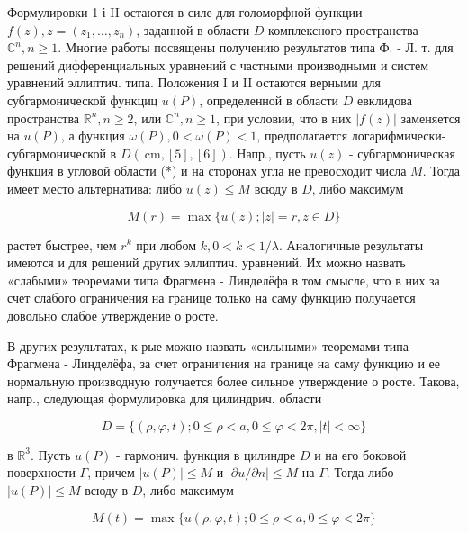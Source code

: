 \documentclass[10pt]{article}
\begin{document}
Формулировки 1 і II остаются в силе для голоморфной функции $f(z), z=\left(z_{1}, \ldots, z_{n}\right)$, заданной в области $D$ комплексного пространства $\mathbb{C}^{n}, n \geqslant 1$. Многие работы посвящены получению результатов типа Ф. - Л. т. для решений дифференциальных уравнений с частными производными и систем уравнений эллиптич. типа. Положения I и II остаются верными для субгармонической функциц $u(P)$, определенной в области $D$ евклидова пространства $\mathbb{R}^{n}, n \geqslant 2$, или $\mathbb{C}^{n}, n \geqslant 1$, при условии, что в них $|f(z)|$ заменяется на $u(P)$, а функция $\omega(P), 0<\omega(P)<1$, предполагается логарифмически-субгармонической в $D(\mathrm{~cm},[5],[6])$. Напр., пусть $u(z)$ - субгармоническая функция в угловой области (*) и на сторонах угла не превосходит числа $M$. Тогда имеет место альтернатива: либо $u(z) \leqslant M$ всюду в $D$, либо максимум



\[

M(r)=\max \{u(z) ;|z|=r, z \in D\}

\]



растет быстрее, чем $r^{k}$ при любом $k, 0<k<1 / \lambda$. Аналогичные результаты имеются и для решений других эллиптич. уравнений. Их можно назвать «слабыми» теоремами типа Фрагмена - Линделёфа в том смысле, что в них за счет слабого ограничения на границе только на саму функцию получается довольно слабое утверждение о росте.



В других результатах, к-рые можно назвать «сильными» теоремами типа Фрагмена - Линделёфа, за счет ограничения на границе на саму функцию и ее нормальную производную голучается более сильное утверждение о росте. Такова, напр., следующая формулировка для цилиндрич. области



\[

D=\{(\rho, \varphi, t) ; 0 \leqslant \rho<a, 0 \leqslant \varphi<2 \pi,|t|<\infty\}

\]



в $\mathbb{R}^{3}$. Пусть $u(P)$ - гармонич. функция в цилиндре $D$ и на его боковой поверхности $\Gamma$, причем $|u(P)| \leqslant M$ и $|\partial u / \partial n| \leqslant M$ на $\Gamma$. Тогда либо $|u(P)| \leqslant M$ всюду в $D$, либо максимум



\[

M(t)=\max \{u(\rho, \varphi, t) ; 0 \leqslant \rho<a, 0 \leqslant \varphi<2 \pi\}

\]
\end{document}
